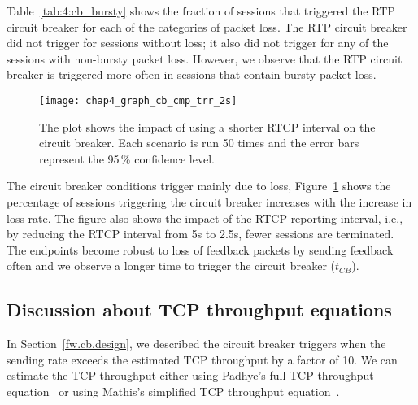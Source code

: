 Table~\ref{tab:4:cb_bursty} shows the fraction of sessions that triggered the
RTP circuit breaker for each of the categories of packet loss. The RTP circuit
breaker did not trigger for sessions without loss; it also did not trigger for
any of the sessions with non-bursty packet loss. However, we observe that the
RTP circuit breaker is triggered more often in sessions that contain bursty
packet loss. 

\begin{figure}[!t]
  \centerline{
    {\texttt{[image: chap4\_graph\_cb\_cmp\_trr\_2s]}}
  }
  \caption{The plot shows the impact of using a shorter RTCP interval on the
  circuit breaker. Each scenario is run 50 times and the error bars represent
  the 95\,\% confidence level.}
  \label{fig:4:short-rtcp}
\end{figure}

The circuit breaker conditions trigger mainly due to loss, Figure~\ref{fig:4:short-rtcp} 
shows the percentage of sessions triggering the circuit breaker
increases with the increase in loss rate. The figure also shows the impact of
the RTCP reporting interval, i.e., by reducing the RTCP interval from 5s to
2.5s, fewer sessions are terminated. The endpoints become robust to loss of
feedback packets by sending feedback often and we observe a longer time to
trigger the circuit breaker ($t_{CB}$).

\subsection{Discussion about TCP throughput equations}

In Section~\ref{fw.cb.design}, we described the circuit breaker triggers when
the sending rate exceeds the estimated TCP throughput by a factor of 10. We
can estimate the TCP throughput either using Padhye's full TCP throughput
equation~\cite{padhye1998modeling} or using Mathis's simplified TCP throughput
equation~\cite{mathis1997macroscopic}.


